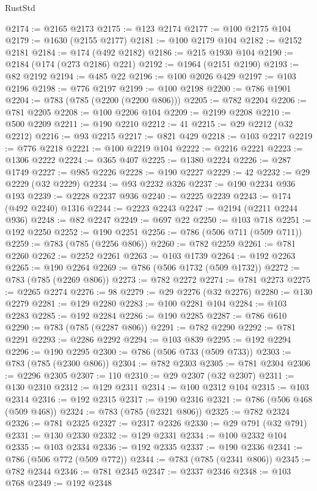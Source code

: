 \begin{lexlean}{RustStd}
\begin{coremodule}
@2174 := @2165 @2173
@2175 := @123 @2174
@2177 := @100 @2175 @104
@2179 := @1630 (@2155 @2177)
@2181 := @100 @2179 @104
@2182 := @2152 @2181
@2184 := @174 (@492 @2182)
@2186 := @215 @1930 @104
@2190 := @2184 (@174 (@273 @2186) @221)
@2192 := @1964 (@2151 @2190)
@2193 := @82 @2192
@2194 := @485 @22
@2196 := @100 @2026 @429
@2197 := @103 @2196
@2198 := @776 @2197
@2199 := @100 @2198
@2200 := @786 @1901
@2204 := @783 (@785 (@2200 (@2200 @806)))
@2205 := @782 @2204
@2206 := @781 @2205
@2208 := @100 @2206 @104
@2209 := @2199 @2208
@2210 := @500 @2209
@2211 := @190 @2210
@2212 := 41
@2215 := @29 @2212 (@32 @2212)
@2216 := @93 @2215
@2217 := @821 @429
@2218 := @103 @2217
@2219 := @776 @2218
@2221 := @100 @2219 @104
@2222 := @2216 @2221
@2223 := @1306 @2222
@2224 := @365 @407
@2225 := @1380 @2224
@2226 := @287 @1749
@2227 := @985 @2226
@2228 := @190 @2227
@2229 := 42
@2232 := @29 @2229 (@32 @2229)
@2234 := @93 @2232 @326
@2237 := @190 @2234 @936 @193
@2239 := @2228 @2237 @936
@2240 := @2225 @2239
@2243 := @174 (@492 @2240) @1316
@2244 := @2223 @2243
@2247 := @2194 (@2211 @2244 @936)
@2248 := @82 @2247
@2249 := @697 @22
@2250 := @103 @718
@2251 := @192 @2250
@2252 := @190 @2251
@2256 := @786 (@506 @711 (@509 @711))
@2259 := @783 (@785 (@2256 @806))
@2260 := @782 @2259
@2261 := @781 @2260
@2262 := @2252 @2261
@2263 := @103 @1739
@2264 := @192 @2263
@2265 := @190 @2264
@2269 := @786 (@506 @1732 (@509 @1732))
@2272 := @783 (@785 (@2269 @806))
@2273 := @782 @2272
@2274 := @781 @2273
@2275 := @2265 @2274
@2276 := 98
@2279 := @29 @2276 (@32 @2276)
@2280 := @130 @2279
@2281 := @129 @2280
@2283 := @100 @2281 @104
@2284 := @103 @2283
@2285 := @192 @2284
@2286 := @190 @2285
@2287 := @786 @610
@2290 := @783 (@785 (@2287 @806))
@2291 := @782 @2290
@2292 := @781 @2291
@2293 := @2286 @2292
@2294 := @103 @839
@2295 := @192 @2294
@2296 := @190 @2295
@2300 := @786 (@506 @733 (@509 @733))
@2303 := @783 (@785 (@2300 @806))
@2304 := @782 @2303
@2305 := @781 @2304
@2306 := @2296 @2305
@2307 := 110
@2310 := @29 @2307 (@32 @2307)
@2311 := @130 @2310
@2312 := @129 @2311
@2314 := @100 @2312 @104
@2315 := @103 @2314
@2316 := @192 @2315
@2317 := @190 @2316
@2321 := @786 (@506 @468 (@509 @468))
@2324 := @783 (@785 (@2321 @806))
@2325 := @782 @2324
@2326 := @781 @2325
@2327 := @2317 @2326
@2330 := @29 @791 (@32 @791)
@2331 := @130 @2330
@2332 := @129 @2331
@2334 := @100 @2332 @104
@2335 := @103 @2334
@2336 := @192 @2335
@2337 := @190 @2336
@2341 := @786 (@506 @772 (@509 @772))
@2344 := @783 (@785 (@2341 @806))
@2345 := @782 @2344
@2346 := @781 @2345
@2347 := @2337 @2346
@2348 := @103 @768
@2349 := @192 @2348

\end{coremodule}
\end{lexlean}
